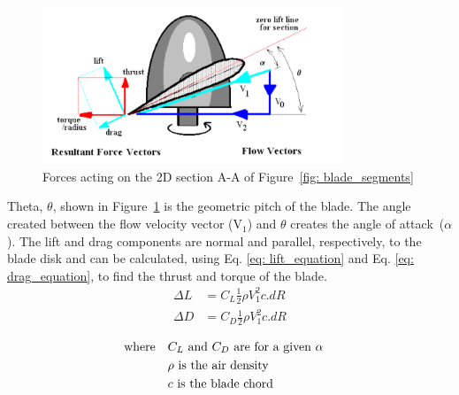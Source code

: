 \begin{figure}[h]
    \centering
    \includegraphics[width =0.8\textwidth]{figs/Blade_Forces.png}
    \caption[Forces acting on the 2D section AA]{Forces acting on the 2D section A-A of Figure~\ref{fig: blade_segments} \citep{blade_element_theory_2024}}
    \label{fig: blade_forces}
\end{figure}
Theta, \(\theta\),  shown in Figure~\ref{fig: blade_forces} is the geometric pitch of the blade. The angle created between the flow velocity vector (V\(_1\)) and \(\theta\) creates the angle of attack~(\(\alpha\)). The lift and drag components are normal and parallel, respectively,  to the blade disk and can be calculated, using Eq. \ref{eq: lift_equation} and Eq. \ref{eq: drag_equation}, to find the thrust and torque of the blade. 
\begin{align}
    \Delta L &= C_L \frac{1}{2} \rho V_1^2 c.dR \label{eq: lift_equation}\\
    \Delta D &= C_D \frac{1}{2} \rho V_1^2 c.dR \label{eq: drag_equation}
\end{align} 
\begin{minipage}{0.45\textwidth}
\vspace*{-8mm}
\begin{align*}
    \text{where} \quad
    &C_L \text{ and } C_D \text{ are for a given } \alpha &\notag \\
    &\rho \text{ is the air density} \notag \\
    &c \text{ is the blade chord} \notag
\end{align*}
\end{minipage}
\\

